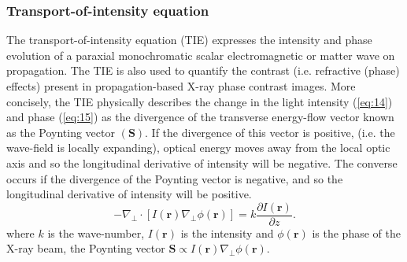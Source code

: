 \documentclass[10pt, a4paper, singlespacing]{report}
\begin{document}
\subsubsection{Transport-of-intensity equation}\label{TIE}
The transport-of-intensity equation (TIE) expresses the intensity and phase evolution of a paraxial monochromatic scalar electromagnetic or matter wave on propagation\cite{Pags2002}. The TIE is also used to quantify the contrast (i.e. refractive (phase) effects) present in propagation-based X-ray phase contrast images\cite{PagsTutes}.
More concisely, the TIE physically describes the change in the light intensity (\ref{eq:14}) and phase (\ref{eq:15}) as the divergence of the transverse energy-flow vector known as the Poynting vector $(\textbf{S})$. If the divergence of this vector is positive, (i.e. the wave-field is locally expanding), optical energy moves away from the local optic axis and so the longitudinal derivative of
intensity will be negative. The converse occurs if the divergence of the Poynting vector is negative, and so the longitudinal derivative of intensity will be positive\cite{PagsTutes}.
\begin{equation}\label{eq:16}
-\nabla_{\perp} \cdot [I(\mathbf{r}) \nabla_{\perp} \phi(\mathbf{r})] = k \frac{\partial I (\mathbf{r})}{\partial z}.
\end{equation}
where $k$ is the wave-number, $I(\mathbf{r})$ is the intensity and $\phi(\mathbf{r})$ is the phase of the X-ray beam, the Poynting vector $\textbf{S} \propto I(\mathbf{r}) \nabla_{\perp} \phi(\mathbf{r})$.

\end{document}

